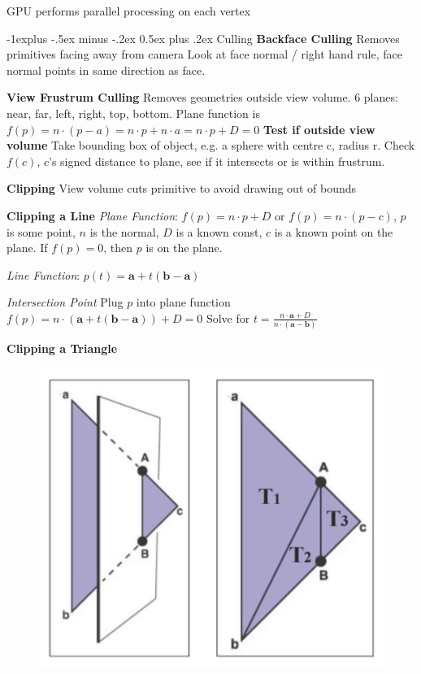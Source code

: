 \documentclass[letterpaper, 8pt]{extarticle}
\makeatletter
\renewcommand{\subsection}{\@startsection{subsection}{2}{0mm}%
                                {-1explus -.5ex minus -.2ex}%
                                {0.5ex plus .2ex}%
                                {\normalfont\tiny\bfseries}}
\makeatother
\begin{document}
\begin{multicols*}{4}
    GPU performs parallel processing on each vertex

    \subsection{Culling}
    \textbf{Backface Culling}
    Removes primitives facing away from camera
    Look at face normal / right hand rule,
    face normal points in same direction as face.

    \textbf{View Frustrum Culling}
    Removes geometries outside view volume.
    6 planes: near, far, left, right, top, bottom.
    Plane function is
    \(
    f(p) = n \cdot (p - a)
    = n \cdot p + n \cdot a
    = n \cdot p + D
    = 0
    \)
    \textbf{Test if outside view volume}
    Take bounding box of object, e.g. a sphere with centre c, radius r.
    Check \(f(c)\), \(c\)'s signed distance to plane, see if it intersects or is within frustrum.

    \textbf{Clipping}
    View volume cuts primitive to avoid drawing out of bounds

    \textbf{Clipping a Line}
    \textit{Plane Function}:
    \(f(p) = n \cdot p + D\) or \(f(p) = n \cdot (p - c)\), \(p\) is some point,
    \(n\) is the normal, \(D\) is a known const, $c$ is a known point on the plane. If $f(p) = 0$, then $p$ is on the plane.

    \textit{Line Function}:
    \(p(t) = \mathbf{a} + t (\mathbf{b} - \mathbf{a})\)

    \textit{Intersection Point}
    Plug \(p\) into plane function \(f(p) = n \cdot (\mathbf{a} + t(\mathbf{b} - \mathbf{a})) + D = 0\)
    Solve for \(t = \frac{n \cdot \textbf{a} + D}{n \cdot (\textbf{a} - \textbf{b})}\)

    \textbf{Clipping a Triangle}
    \begin{figure}[!ht]
        \includegraphics[width=\linewidth]{triangle-clipping.png}
    \end{figure}


\end{multicols*}
\end{document}
